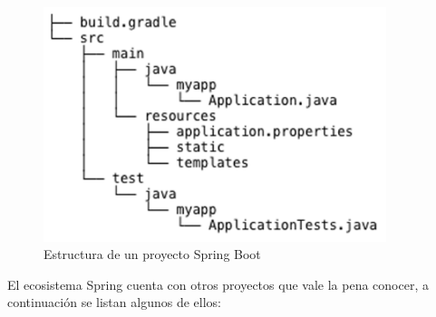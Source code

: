 		\begin{figure}[H]
		    \centering
			\includegraphics[width=10cm]{../imgs/ejemplos/spring-boot-est.png}
			\caption{Estructura de un proyecto Spring Boot}
			\label{figure:spring-boot-est}
		\end{figure}
		
		El ecosistema Spring cuenta con otros proyectos que vale la pena conocer, a
		continuación se listan algunos de ellos:
		
